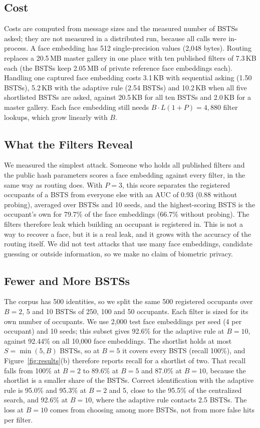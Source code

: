 \documentclass[pdflatex,sn-mathphys-num]{sn-jnl}%
\theoremstyle{thmstyleone}%
\theoremstyle{thmstyletwo}%
\theoremstyle{thmstylethree}%
\begin{document}
\subsection{Cost}
\label{sec:cost}

Costs are computed from message sizes and the measured number of BSTSs asked; they are not measured in a distributed run, because all calls were in-process. A face embedding has 512 single-precision values (2,048 bytes). Routing replaces a 20.5\,MB master gallery in one place with ten published filters of 7.3\,KB each (the BSTSs keep 2.05\,MB of private reference face embeddings each). Handling one captured face embedding costs 3.1\,KB with sequential asking (1.50 BSTSs), 5.2\,KB with the adaptive rule (2.54 BSTSs) and 10.2\,KB when all five shortlisted BSTSs are asked, against 20.5\,KB for all ten BSTSs and 2.0\,KB for a master gallery. Each face embedding still needs $B\cdot L(1+P)=4{,}880$ filter lookups, which grow linearly with $B$.

\subsection{What the Filters Reveal}
\label{sec:leak}

We measured the simplest attack. Someone who holds all published filters and the public hash parameters scores a
face embedding against every filter, in the same way as routing does. With $P=3$, this score separates the registered occupants of a
BSTS from everyone else with an AUC of 0.93 (0.88 without probing), averaged over BSTSs and
10 seeds, and the highest-scoring BSTS is the occupant's own for 79.7\% of the face embeddings
(66.7\% without probing). The filters therefore leak which building an occupant is registered in. This is not a way to
recover a face, but it is a real leak, and it grows with the accuracy of the routing itself. We did not test attacks
that use many face embeddings, candidate guessing or outside information, so we make no claim of biometric privacy.

\subsection{Fewer and More BSTSs}
\label{sec:scale}

The corpus has 500 identities, so we split the same 500 registered occupants over $B=2$, 5 and 10 BSTSs of 250, 100 and 50 occupants. Each filter is sized for its own number of occupants. We use 2,000 test face embeddings per seed (4 per occupant) and 10 seeds; this subset gives 92.6\% for the adaptive rule at $B=10$, against 92.44\% on all 10,000 face embeddings. The shortlist holds at most $S=\min(5,B)$ BSTSs, so at $B=5$ it covers every BSTS (recall 100\%), and Figure~\ref{fig:results}(b) therefore reports recall for a shortlist of two. That recall falls from 100\% at $B=2$ to 89.6\% at $B=5$ and 87.0\% at $B=10$, because the shortlist is a smaller share of the BSTSs. Correct identification with the adaptive rule is 95.0\% and 95.3\% at $B=2$ and 5, close to the 95.5\% of the centralized search, and 92.6\% at $B=10$, where the adaptive rule contacts 2.5 BSTSs. The loss at $B=10$ comes from choosing among more BSTSs, not from more false hits per filter.
\end{document}
